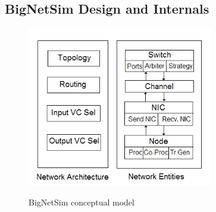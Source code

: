 \subsection{BigNetSim Design and Internals}
\begin{figure}[!t]
\centering  
  \includegraphics[width=3.2in]{figures/detailedsim_newer}
{\sffamily\bfseries\small \caption{BigNetSim conceptual model\label{fig:detailedsim_model}}}
\end{figure}

